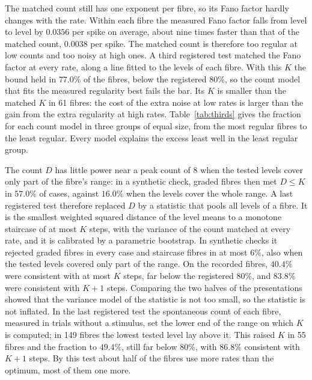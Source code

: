\documentclass[10pt,letterpaper]{article}
\begin{document}
The matched count still has one exponent per fibre, so its Fano factor hardly changes with the rate. Within each fibre the measured
Fano factor falls from level to level by $0.0356$ per spike on average, about nine times faster than that of the matched count,
$0.0038$ per spike. The matched count is therefore too regular at
low counts and too noisy at high ones. A third registered test matched the Fano factor at every rate, along a line fitted to the
levels of each fibre. With this $K$ the bound held in $77.0\%$ of the fibres, below the registered $80\%$, so the count model that fits
the measured regularity best fails the bar. Its $K$ is smaller than the matched $K$ in 61 fibres: the cost of the extra noise at low
rates is larger than the gain from the extra regularity at high rates. Table~\ref{tab:thirds} gives the fraction for each count model in
three groups of equal size, from the most regular fibres to the least regular. Every model explains the excess least well in the
least regular group.

The count $D$ has little power near a peak count of 8 when the tested levels cover only part of the fibre's range: in a synthetic
check, graded fibres then met $D\le K$ in $57.0\%$ of cases, against $16.0\%$ when the levels cover the whole range. A last registered test therefore replaced $D$ by a statistic that pools
all levels of a fibre. It is the smallest weighted squared distance of the level means to a monotone staircase of at most $K$ steps, with the
variance of the count matched at every rate, and it is calibrated by a parametric bootstrap. In synthetic checks it rejected graded
fibres in every case and staircase fibres in at most $6\%$, also when the tested levels covered only part of the range. On the
recorded fibres, $40.4\%$ were consistent with at most $K$ steps, far below the registered $80\%$, and $83.8\%$ were consistent with
$K+1$ steps. Comparing the two halves of the presentations showed that the variance model of the statistic is not too small, so the
statistic is not inflated. In the last registered test the spontaneous count of each fibre, measured in trials without a stimulus,
set the lower end of the range on which $K$ is computed; in 149 fibres the lowest tested level lay above it. This raised $K$ in 55
fibres and the fraction to $49.4\%$, still far below $80\%$, with $86.8\%$ consistent with $K+1$ steps. By this test about half of the
fibres use more rates than the optimum, most of them one more.
\end{document}

